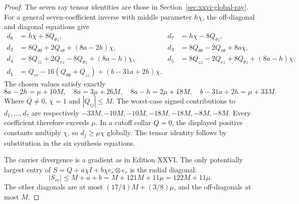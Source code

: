 \begin{proof}
The seven ray tensor identities are those in
Section~\ref{sec:xxvi-global-ray}. For a general
seven-coefficient inverse with middle parameter $h\chi$,
the off-diagonal and diagonal equations give
\[
\begin{aligned}
d_6&=h\chi+8Q_{\theta z},&d_7&=h\chi-8Q_{\theta z},\\
d_2&=8Q_{\theta\theta}+2Q_{r\theta}
      +(8a-2h)\chi,&
d_3&=8Q_{\theta\theta}-2Q_{r\theta}+8a\chi,\\
d_4&=8Q_{zz}+2Q_{rz}-8Q_{\theta z}
      +(8a-h)\chi,&
d_5&=8Q_{zz}-2Q_{rz}+8Q_{\theta z}
      +(8a-h)\chi,\\
d_1&=Q_{rr}-16(Q_{\theta\theta}+Q_{zz})
      +(b-31a+2h)\chi.
\end{aligned}
\]
The chosen values satisfy exactly
\[
8a-2h=\mu+10M,\quad 8a=3\mu+26M,\quad
8a-h=2\mu+18M,\quad
b-31a+2h=\mu+33M.
\]
Where $Q\ne0$, $\chi=1$ and $|Q_{ij}|\le M$.
The worst-case signed contributions to $d_1,\ldots,d_7$
are respectively $-33M,-10M,-10M,-18M,-18M,-8M,-8M$.
Every coefficient therefore exceeds $\mu$. In a cutoff
collar $Q=0$, the displayed positive constants multiply $\chi$,
so $d_j\ge\mu\chi$ globally. The tensor identity follows by
substitution in the six synthesis equations.

The carrier divergence is a gradient as in Edition XXVI.
The only potentially largest entry of
$S=Q+a\chi I+b\chi e_r\otimes e_r$ is the radial diagonal:
\[
|S_{rr}|\le M+a+b=M+121M+11\mu=122M+11\mu.
\]
The other diagonals are at most
$(17/4)M+(3/8)\mu$, and the off-diagonals at most $M$.
\end{proof}


